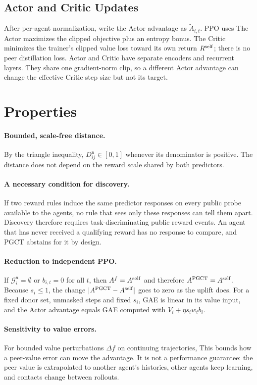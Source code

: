 \documentclass{article}
\begin{document}
\subsection{Actor and Critic Updates}
After per-agent normalization, write the Actor advantage as $\widetilde A_{i,t}$. PPO uses
\PPOEquation
The Actor maximizes the clipped objective plus an entropy bonus. The Critic minimizes the trainer's clipped value loss toward its own return $R^{\rm self}$; there is no peer distillation loss. Actor and Critic have separate encoders and recurrent layers. They share one gradient-norm clip, so a different Actor advantage can change the effective Critic step size but not its target.

\section{Properties}
\paragraph{Bounded, scale-free distance.} By the triangle inequality, $D_{ij}^u\in[0,1]$ whenever its denominator is positive. The distance does not depend on the reward scale shared by both predictors.

\paragraph{A necessary condition for discovery.} If two reward rules induce the same predictor responses on every public probe available to the agents, no rule that sees only these responses can tell them apart. Discovery therefore requires task-discriminating public reward events. An agent that has never received a qualifying reward has no response to compare, and PGCT abstains for it by design.

\paragraph{Reduction to independent PPO.} If $\mathcal G_i^u=\emptyset$ or $b_{i,t}=0$ for all $t$, then $A^{f}=A^{\rm self}$ and therefore $A^{\rm PGCT}=A^{\rm self}$. Because $s_i\le1$, the change $|A^{\rm PGCT}-A^{\rm self}|$ goes to zero as the uplift does. For a fixed donor set, unmasked steps and fixed $s_i$, GAE is linear in its value input, and the Actor advantage equals GAE computed with $V_i+\eta s_i w_t b_i$.

\paragraph{Sensitivity to value errors.} For bounded value perturbations $\Delta f$ on continuing trajectories,
\BoundEquation
This bounds how a peer-value error can move the advantage. It is not a performance guarantee: the peer value is extrapolated to another agent's histories, other agents keep learning, and contacts change between rollouts.
\end{document}
